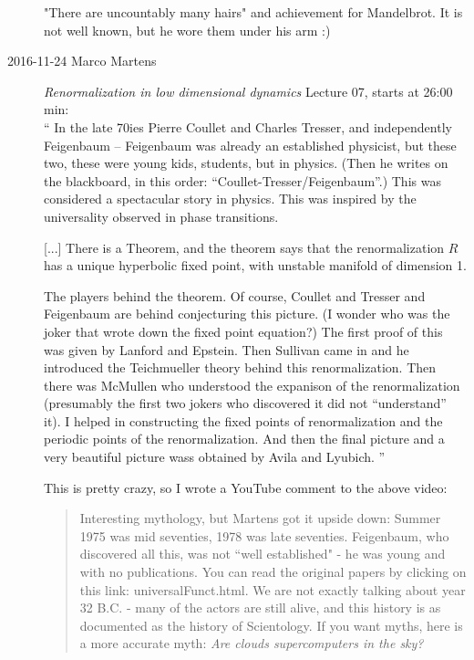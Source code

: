\begin{description}
"There are uncountably many hairs"
and achievement for Mandelbrot. It is not well known, but he wore them under his arm :)

\newpage %
\item[2016-11-24 Marco Martens]
\emph{Renormalization in low dimensional dynamics}
{Lecture 07}, starts at 26:00 min:
\\
``
In the late 70ies Pierre Coullet and Charles Tresser, and independently
Feigenbaum -- Feigenbaum was already an established physicist, but these
two, these were young kids, students, but in physics. (Then he writes on
the blackboard,  in this order: ``Coullet-Tresser/Feigenbaum''.) This was
considered a spectacular story in physics. This was inspired by the
universality observed in phase transitions.

[...]
There is a Theorem, and the theorem says that the renormalization $R$
has a unique hyperbolic fixed point, with unstable manifold of dimension 1.

The players behind the theorem. Of course, Coullet and Tresser and
Feigenbaum are behind conjecturing this picture. (I wonder
who was the joker that wrote down the fixed point equation?) The first
proof of this was given by {Lanford} and
Epstein. Then Sullivan came in and he
introduced the Teichmueller theory behind this renormalization. Then
there was McMullen who understood the expanison of the
renormalization (presumably the first two jokers who discovered it did
not ``understand'' it). I helped in constructing the fixed points of
renormalization and the periodic points of the
renormalization. And then the final
picture and a very beautiful picture wass obtained by Avila and
Lyubich.
''

This is pretty crazy, so I wrote a YouTube comment to the above video:

\begin{quote}
Interesting mythology, but Martens got it upside down: Summer 1975 was
mid seventies, 1978 was late seventies. Feigenbaum, who discovered all
this, was not ``well established" - he was young and with no
publications. You can read the original papers by clicking on this link:
{universalFunct.html}. We are not
exactly talking about year 32 B.C. - many of the actors are still alive,
and this history is as documented as the history of Scientology. If you
want myths, here is a more accurate myth:
 {\em Are clouds supercomputers in the
sky?}
\end{quote}


\end{description}
